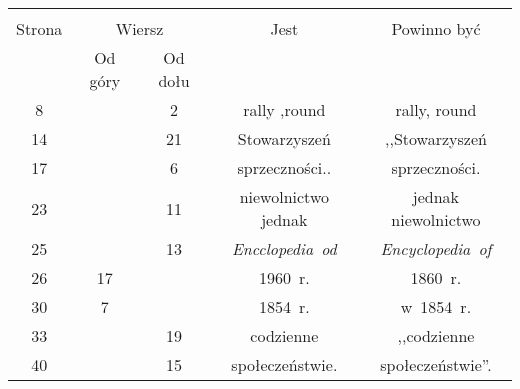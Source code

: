 \documentclass[a4paper,11pt]{article}
\begin{document}
\begin{center}
  \begin{tabular}{|c|c|c|c|c|}
    \hline
    & \multicolumn{2}{c|}{} & & \\
    Strona & \multicolumn{2}{c|}{Wiersz} & Jest
                              & Powinno być \\ \cline{2-3}
    & Od góry & Od dołu & & \\
    \hline
    8   & &  2 & rally ,round & rally, round \\
    14  & & 21 & Stowarzyszeń & ,,Stowarzyszeń  %
    \\
    17  & &  6 & sprzeczności.. & sprzeczności. \\
    23  & & 11 & niewolnictwo jednak & jednak niewolnictwo \\
    25  & & 13 & \emph{Encclopedia~od} & \emph{Encyclopedia~of} \\
    26  & 17 & & 1960~r. & 1860~r. \\
    30  &  7 & & 1854~r. & w~1854~r. \\
    33  & & 19 & codzienne & ,,codzienne  %
    \\
    40  & & 15 & społeczeństwie. & społeczeństwie''. \\
    \hline
  \end{tabular}


\end{center}
\end{document}
